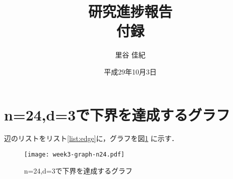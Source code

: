 \documentclass[11pt]{jarticle}
\title{研究進捗報告 \\ 付録}
\author{里谷 佳紀}
\date{平成29年10月3日}
\begin{document}
%
\maketitle
\thispagestyle{empty}
%
\appendix
\section{n=24,d=3で下界を達成するグラフ}
辺のリストをリスト\ref{list:edge}に，グラフを図\ref{fig:cerf-graph}
に示す．

\label{list:edge}
\begin{multicols}{4}
  
\end{multicols}

\begin{figure}[H]
  \centering
  \texttt{[image: week3-graph-n24.pdf]}
  \caption{n=24,d=3で下界を達成するグラフ}
  \label{fig:cerf-graph}
\end{figure}
\end{document}
